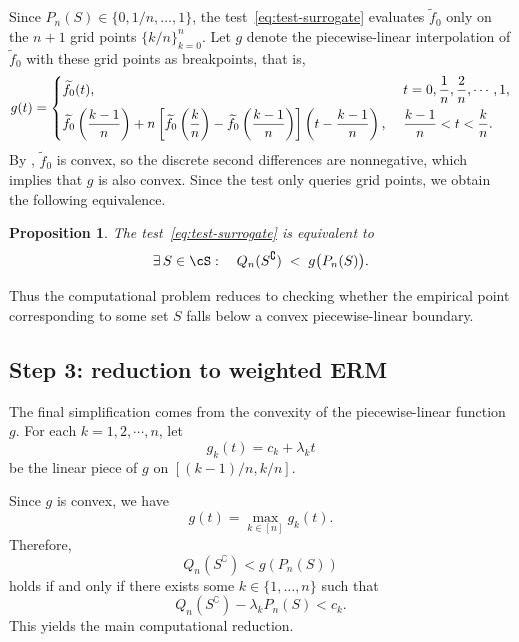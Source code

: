 \documentclass[english]{article}
\theoremstyle{plain}
\newtheorem{proposition}{Proposition}[section]
\theoremstyle{definition}
\newcommand{\fnull}{f_0}
\begin{document}
Since \(P_n(S) \in \{0, 1/n, \ldots, 1\}\), the test~\eqref{eq:test-surrogate}
evaluates \(\widetilde{f}_0\) only on the \(n+1\) grid points
\(\{k/n\}_{k=0}^n\). Let \(g\) denote the piecewise-linear interpolation of
\(\widetilde{f}_0\) with these grid points as breakpoints, that is,
\begin{align}\label{eq:piecewise_linear_interpolation}
g(t)=\begin{dcases}
\widetilde{\fnull}(t),\ &t=0,\frac{1}{n},\frac{2}{n},\cdots,1,\\
\widetilde{\fnull}\left(\frac{k-1}{n}\right)
+n\left[\widetilde{\fnull}\left(\frac{k}{n}\right)-\widetilde{\fnull}\left(\frac{k-1}{n}\right)\right]\left(t-\frac{k-1}{n}\right),
\ &\frac{k-1}{n}<t< \frac{k}{n}.
\end{dcases}
\end{align}
By , \(\widetilde{f}_0\) is
convex, so the discrete second differences are nonnegative, which implies that
\(g\) is also convex. Since the test only queries grid points, we obtain the
following equivalence.

\begin{proposition}\label{prop:reduction_to_piecewise_linear}
The test~\eqref{eq:test-surrogate} is equivalent to
\begin{equation}\label{eq:test-pwl}
\exists\, S \in \cS:\quad
Q_n(S^\complement) \;<\; g\bigl(P_n(S)\bigr).
\end{equation}
\end{proposition}

Thus the computational problem reduces to checking whether the empirical point
corresponding to some set \(S\) falls below a convex piecewise-linear boundary.

\subsection{Step 3: reduction to weighted ERM}\label{sec:reduction-cover}

The final simplification comes from the convexity of the piecewise-linear
function \(g\). For each \(k=1,2,\cdots,n\), let
\[
g_k(t)=c_k+\lambda_k t
\]
be the linear piece of \(g\) on \([(k-1)/n,k/n]\).

Since \(g\) is convex, we have
\[
g(t)=\max_{k\in[n]} g_k(t).
\]
Therefore,
\[
Q_n(S^\complement)<g(P_n(S))
\]
holds if and only if there exists some \(k\in\{1,\dots,n\}\) such that
\[
Q_n(S^\complement)-\lambda_k P_n(S)<c_k.
\]
This yields the main computational reduction.
\end{document}
